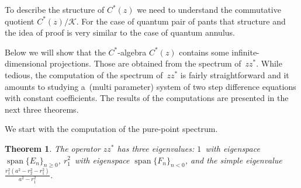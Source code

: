\documentclass[pdftex]{sigma}
\numberwithin{equation}{section}
\newtheorem{Theorem}{Theorem}[section]
\begin{document}
To describe the structure of $C^*(z)$ we need to understand the commutative quotient $C^*(z)/\mathcal{K}$.
For the case of quantum pair of pants that structure and the idea of proof is very similar to the case of quantum
annulus.

Below we will show that the $C^*$-algebra $C^*(z)$ contains some inf\/inite-dimensional projections.
Those are obtained from the spectrum of~$zz^*$.
While tedious, the computation of the spectrum of~$zz^*$ is fairly straightforward and it amounts to studying a~(multi
parameter) system of two step dif\/ference equations with constant coef\/f\/icients.
The results of the computations are presented in the next three theorems.

We start with the computation of the pure-point spectrum.

\begin{Theorem}
\label{discspecthm}
The operator $zz^*$ has three eigenvalues: $1$~with eigenspace $\operatorname{span}\{E_n\}_{n\geq 0}$, $r_1^2$~with eigenspace
$\operatorname{span}\{F_n\}_{n< 0}$, and the simple eigenvalue $\frac{r_1^2(a^2-r_2^2-r_1^2)}{a^2-r_1^2}$.
\end{Theorem}
\end{document}
